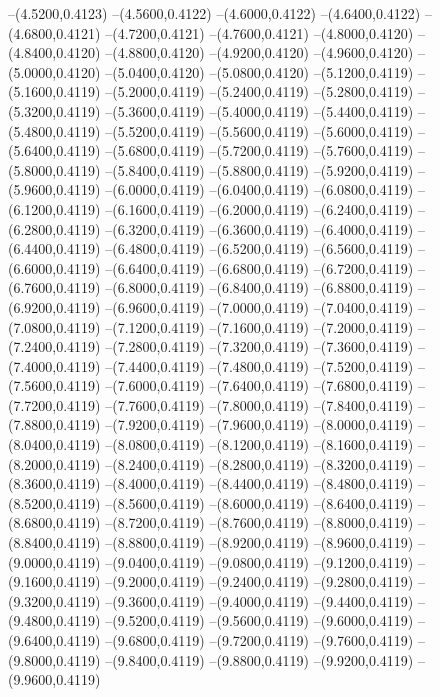 {	--(4.5200,0.4123)
	--(4.5600,0.4122)
	--(4.6000,0.4122)
	--(4.6400,0.4122)
	--(4.6800,0.4121)
	--(4.7200,0.4121)
	--(4.7600,0.4121)
	--(4.8000,0.4120)
	--(4.8400,0.4120)
	--(4.8800,0.4120)
	--(4.9200,0.4120)
	--(4.9600,0.4120)
	--(5.0000,0.4120)
	--(5.0400,0.4120)
	--(5.0800,0.4120)
	--(5.1200,0.4119)
	--(5.1600,0.4119)
	--(5.2000,0.4119)
	--(5.2400,0.4119)
	--(5.2800,0.4119)
	--(5.3200,0.4119)
	--(5.3600,0.4119)
	--(5.4000,0.4119)
	--(5.4400,0.4119)
	--(5.4800,0.4119)
	--(5.5200,0.4119)
	--(5.5600,0.4119)
	--(5.6000,0.4119)
	--(5.6400,0.4119)
	--(5.6800,0.4119)
	--(5.7200,0.4119)
	--(5.7600,0.4119)
	--(5.8000,0.4119)
	--(5.8400,0.4119)
	--(5.8800,0.4119)
	--(5.9200,0.4119)
	--(5.9600,0.4119)
	--(6.0000,0.4119)
	--(6.0400,0.4119)
	--(6.0800,0.4119)
	--(6.1200,0.4119)
	--(6.1600,0.4119)
	--(6.2000,0.4119)
	--(6.2400,0.4119)
	--(6.2800,0.4119)
	--(6.3200,0.4119)
	--(6.3600,0.4119)
	--(6.4000,0.4119)
	--(6.4400,0.4119)
	--(6.4800,0.4119)
	--(6.5200,0.4119)
	--(6.5600,0.4119)
	--(6.6000,0.4119)
	--(6.6400,0.4119)
	--(6.6800,0.4119)
	--(6.7200,0.4119)
	--(6.7600,0.4119)
	--(6.8000,0.4119)
	--(6.8400,0.4119)
	--(6.8800,0.4119)
	--(6.9200,0.4119)
	--(6.9600,0.4119)
	--(7.0000,0.4119)
	--(7.0400,0.4119)
	--(7.0800,0.4119)
	--(7.1200,0.4119)
	--(7.1600,0.4119)
	--(7.2000,0.4119)
	--(7.2400,0.4119)
	--(7.2800,0.4119)
	--(7.3200,0.4119)
	--(7.3600,0.4119)
	--(7.4000,0.4119)
	--(7.4400,0.4119)
	--(7.4800,0.4119)
	--(7.5200,0.4119)
	--(7.5600,0.4119)
	--(7.6000,0.4119)
	--(7.6400,0.4119)
	--(7.6800,0.4119)
	--(7.7200,0.4119)
	--(7.7600,0.4119)
	--(7.8000,0.4119)
	--(7.8400,0.4119)
	--(7.8800,0.4119)
	--(7.9200,0.4119)
	--(7.9600,0.4119)
	--(8.0000,0.4119)
	--(8.0400,0.4119)
	--(8.0800,0.4119)
	--(8.1200,0.4119)
	--(8.1600,0.4119)
	--(8.2000,0.4119)
	--(8.2400,0.4119)
	--(8.2800,0.4119)
	--(8.3200,0.4119)
	--(8.3600,0.4119)
	--(8.4000,0.4119)
	--(8.4400,0.4119)
	--(8.4800,0.4119)
	--(8.5200,0.4119)
	--(8.5600,0.4119)
	--(8.6000,0.4119)
	--(8.6400,0.4119)
	--(8.6800,0.4119)
	--(8.7200,0.4119)
	--(8.7600,0.4119)
	--(8.8000,0.4119)
	--(8.8400,0.4119)
	--(8.8800,0.4119)
	--(8.9200,0.4119)
	--(8.9600,0.4119)
	--(9.0000,0.4119)
	--(9.0400,0.4119)
	--(9.0800,0.4119)
	--(9.1200,0.4119)
	--(9.1600,0.4119)
	--(9.2000,0.4119)
	--(9.2400,0.4119)
	--(9.2800,0.4119)
	--(9.3200,0.4119)
	--(9.3600,0.4119)
	--(9.4000,0.4119)
	--(9.4400,0.4119)
	--(9.4800,0.4119)
	--(9.5200,0.4119)
	--(9.5600,0.4119)
	--(9.6000,0.4119)
	--(9.6400,0.4119)
	--(9.6800,0.4119)
	--(9.7200,0.4119)
	--(9.7600,0.4119)
	--(9.8000,0.4119)
	--(9.8400,0.4119)
	--(9.8800,0.4119)
	--(9.9200,0.4119)
	--(9.9600,0.4119)
}
